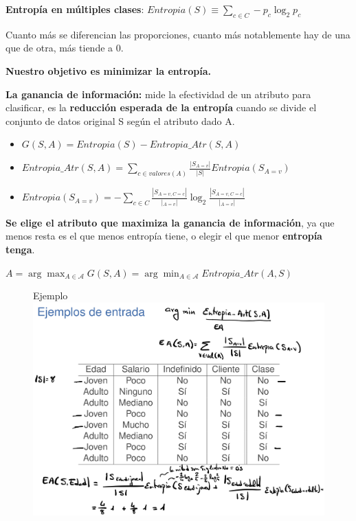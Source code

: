 \documentclass[12pt]{report} %
\begin{document}
\textbf{Entropía en múltiples clases}:
\(Entropia(S) \equiv \sum_{c\in C} -p_c \log _2 p_c\)

Cuanto más se diferencian las proporciones, cuanto más notablemente hay
de una que de otra, más tiende a 0.

\textbf{Nuestro objetivo es minimizar la entropía.}

\textbf{La ganancia de información:} mide la efectividad de un atributo
para clasificar, es la \textbf{reducción esperada de la entropía} cuando
se divide el conjunto de datos original S según el atributo dado A.

\begin{itemize}
\item
  \(G(S,A)=Entropia(S) - Entropia\_ Atr(S,A)\)
\item
  \(Entropia\_ Atr(S,A)= \sum_{c \in valores(A)} \frac {|S_{A=v}|}{|S|} Entropia(S_{A=v})\)
\item
  \(Entropia(S_{A=v})= -\sum_{c \in C} \frac {|S_{A=v,C=c}|}{|_{A=v}|} \log_2 \frac {|S_{A=v,C=c}|}{|_{A=v}|}\)
\end{itemize}

\textbf{Se elige el atributo que maximiza la ganancia de información},
ya que menos resta es el que menos entropía tiene, o elegir el que menor
\textbf{entropía tenga}.

\(A= \arg\max_{A \in \mathcal{A}} G(S,A) = \arg\min_{A \in \mathcal{A}} Entropia \_ Atr(A,S)\)


\begin{figure}[H]
	Ejemplo
	{\includegraphics[scale=.15]{Untitled 10.png}}
\end{figure}
\end{document}

